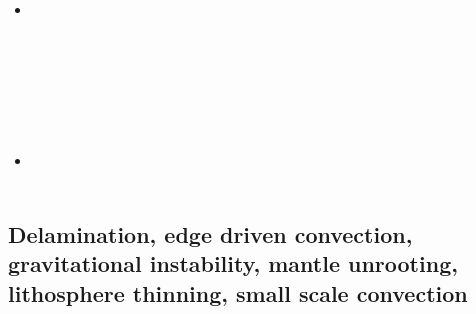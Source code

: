\begin{scriptsize}
\begin{itemize}
\textcite{stbe18} \\
\item[\twothousandnineteen] 
\textcite{koen19} \\
\textcite{kipd19} \\
\textcite{crcm19} \\
\textcite{pedm19} \\
\textcite{mazz19} \\
\textcite{chch19} \\
\textcite{jart19} \\
\item[\twothousandtwenty] 
\textcite{yamq20} \\ 
\textcite{miko20} \\ 
\end{itemize}
\end{scriptsize}


\subsection{Delamination, edge driven convection, gravitational instability, mantle unrooting, lithosphere thinning, small scale convection} 


